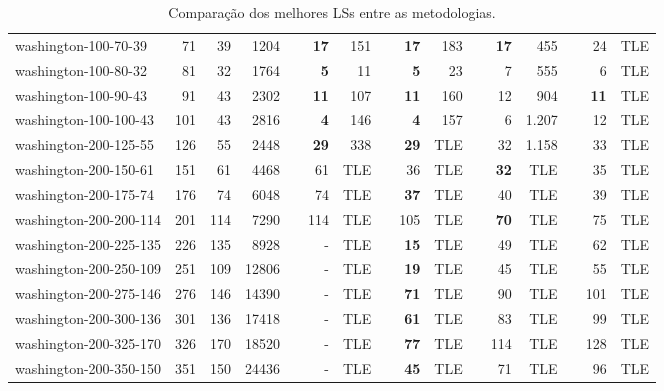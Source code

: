\begin{table}[!ht]
{\begin{tabular}{lrrrlrrlrrlrrlrr}
washington-100-70-39 & 71 & 39 & 1204 &  & \textbf{17} & 151 &  & \textbf{17} & 183 &  & \textbf{17} & 455 &  & 24 & TLE \\
washington-100-80-32 & 81 & 32 & 1764 &  & \textbf{5} & 11 &  & \textbf{5} & 23 &  & 7 & 555 &  & 6 & TLE \\
washington-100-90-43 & 91 & 43 & 2302 &  & \textbf{11} & 107 &  & \textbf{11} & 160 &  & 12 & 904 &  & \textbf{11} & TLE \\
washington-100-100-43 & 101 & 43 & 2816 &  & \textbf{4} & 146 &  & \textbf{4} & 157 &  & 6 & 1.207 &  & 12 & TLE \\ \hline
washington-200-125-55 & 126 & 55 & 2448 &  & \textbf{29} & 338 &  & \textbf{29} & TLE &  & 32 & 1.158 &  & 33 & TLE \\
washington-200-150-61 & 151 & 61 & 4468 &  & 61 & TLE &  & 36 & TLE &  & \textbf{32} & TLE &  & 35 & TLE \\
washington-200-175-74 & 176 & 74 & 6048 &  & 74 & TLE &  & \textbf{37} & TLE &  & 40 & TLE &  & 39 & TLE \\
washington-200-200-114 & 201 & 114 & 7290 &  & 114 & TLE &  & 105 & TLE &  & \textbf{70} & TLE &  & 75 & TLE \\
washington-200-225-135 & 226 & 135 & 8928 &  & - & TLE &  & \textbf{15} & TLE &  & 49 & TLE &  & 62 & TLE \\
washington-200-250-109 & 251 & 109 & 12806 &  & - & TLE &  & \textbf{19} & TLE &  & 45 & TLE &  & 55 & TLE \\
washington-200-275-146 & 276 & 146 & 14390 &  & - & TLE &  & \textbf{71} & TLE &  & 90 & TLE &  & 101 & TLE \\
washington-200-300-136 & 301 & 136 & 17418 &  & - & TLE &  & \textbf{61} & TLE &  & 83 & TLE &  & 99 & TLE \\
washington-200-325-170 & 326 & 170 & 18520 &  & - & TLE &  & \textbf{77} & TLE &  & 114 & TLE &  & 128 & TLE \\
washington-200-350-150 & 351 & 150 & 24436 &  & - & TLE &  & \textbf{45} & TLE &  & 71 & TLE &  & 96 & TLE \\ \hline
\end{tabular}%
}
\caption{Comparação dos melhores LSs entre as metodologias.}
\label{tab:ls-all-comp}
\end{table}

